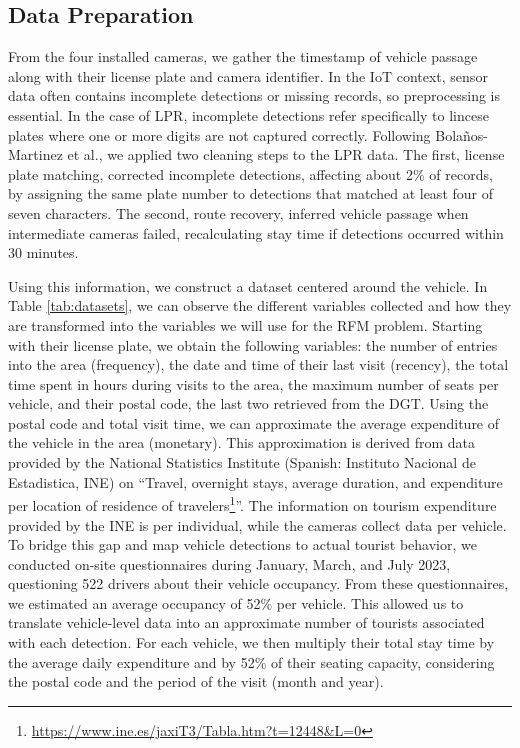 \documentclass{ws-ijitdm}
\begin{document}
\subsection{Data Preparation}

From the four installed cameras, we gather the timestamp of vehicle passage along with their license plate and camera identifier. {\color{black}In the IoT context, sensor data often contains incomplete detections or missing records, so preprocessing is essential. In the case of LPR, incomplete detections refer specifically to lincese plates where one or more digits are not captured correctly. Following Bolaños-Martinez et al.\cite{cleaning}, we applied two cleaning steps to the LPR data. The first, license plate matching, corrected incomplete detections, affecting about 2\% of records, by assigning the same plate number to detections that matched at least four of seven characters. The second, route recovery, inferred vehicle passage when intermediate cameras failed, recalculating stay time if detections occurred within 30 minutes.}

Using this information, we construct a dataset centered around the vehicle.  In Table \ref{tab:datasets}, we can observe the different variables collected and how they are transformed into the variables we will use for the RFM problem. Starting with their license plate, we obtain the following variables: the number of entries into the area (frequency), the date and time of their last visit (recency), the total time spent in hours during visits to the area, {\color{black}the maximum number of seats per vehicle, and their postal code, the last two} retrieved from the DGT. Using the postal code and total visit time, we can approximate the average expenditure of the vehicle in the area (monetary). This approximation is derived from data provided by the National Statistics Institute (Spanish: Instituto Nacional de Estadistica, INE) on ``Travel, overnight stays, average duration, and expenditure per location of residence of travelers\footnote{\url{https://www.ine.es/jaxiT3/Tabla.htm?t=12448&L=0}}''. The information on tourism expenditure provided by the INE is per individual, while the cameras collect data per vehicle. {\color{black}To bridge this gap and map vehicle detections to actual tourist behavior, we conducted on-site questionnaires during January, March, and July 2023, questioning 522 drivers about their vehicle occupancy.} From these questionnaires, we estimated an average occupancy of 52\% per vehicle. {\color{black}This allowed us to translate vehicle-level data into an approximate number of tourists associated with each detection.} For each vehicle, we then multiply their total stay time by the average daily expenditure and by 52\% of their seating capacity, considering the postal code and the period of the visit (month and year).
\end{document}
